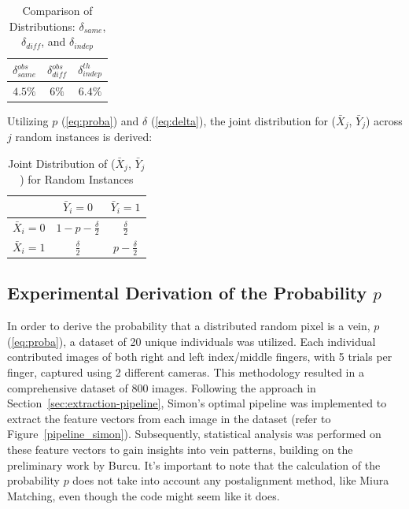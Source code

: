 \begin{table}[H]
    \centering
    \renewcommand{\arraystretch}{1.25}\begin{tabular}{|c|c|c|}
        \hline
        $\delta_{same}^{obs}$ & $\delta_{diff}^{obs}$ & $\delta_{indep}^{th}$\\
        \hline
        $4.5\%$ & $6\%$ & $6.4\%$\\
        \hline
    \end{tabular}
\caption{Comparison of Distributions: $\delta_{same}$, $\delta_{diff}$, and $\delta_{indep}$}
\end{table}

Utilizing $p$ (\ref{eq:proba}) and $\delta$ (\ref{eq:delta}), the joint distribution for (\(\bar{X}_j\), \(\bar{Y}_j\)) across \(j\) random instances is derived:

\begin{table}[H]
    \centering
    \renewcommand{\arraystretch}{1.5}
    \begin{tabular}{|c|c|c|}
        \hline
        & $\bar{Y}_i = 0$ & $\bar{Y}_i = 1$\\
        \hline
        $\bar{X}_i = 0$ & $1 - p - \frac{\delta}{2}$ & $\frac{\delta}{2}$\\
        \hline
        $\bar{X}_i = 1$ & $\frac{\delta}{2}$ & $p - \frac{\delta}{2}$\\
        \hline
    \end{tabular}
    \caption{Joint Distribution of ($\bar{X}_j$, $\bar{Y}_j$) for Random Instances}
    \label{tab:joint_distribution}
\end{table}

\subsection{Experimental Derivation of the Probability \(p\)}

In order to derive the probability that a distributed random pixel is a vein, $p$ (\ref{eq:proba}), a dataset of 20 unique individuals was utilized. Each individual contributed images of both right and left index/middle fingers, with 5 trials per finger, captured using 2 different cameras. This methodology resulted in a comprehensive dataset of 800 images. Following the approach in Section~\ref{sec:extraction-pipeline}, Simon's optimal pipeline was implemented to extract the feature vectors from each image in the dataset (refer to Figure~\ref{pipeline_simon}). Subsequently, statistical analysis was performed on these feature vectors to gain insights into vein patterns, building on the preliminary work by Burcu. It's important to note that the calculation of the probability \(p\) does not take into account any postalignment method, like Miura Matching, even though the code might seem like it does.

